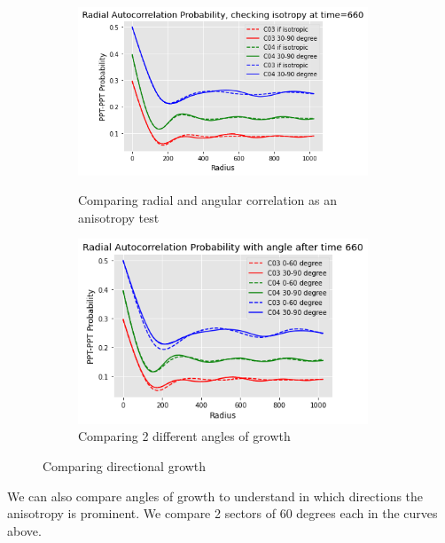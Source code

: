 \documentclass[12pt, a4paper]{report}
\begin{document}
\begin{figure}[H]
\centering
\begin{subfigure}{.49\textwidth}
  \centering
  \includegraphics[width=0.95\textwidth]{Pictures/MSFeatures/ShowingAnisotropyAngle.png}
  \label{img:microstrImg}
  \caption{Comparing radial and angular correlation as an anisotropy test}
\end{subfigure}
\begin{subfigure}{.49\textwidth}
  \centering
  \includegraphics[width=0.95\textwidth]{Pictures/MSFeatures/RadialCorr306090Comparison.png}
  \caption{Comparing 2 different angles of growth}
  \label{img:microstrImg}
\end{subfigure}

\caption{Comparing directional growth}
\label{fig:test}
\end{figure}

We can also compare angles of growth to understand in which directions the anisotropy is prominent. We compare 2 sectors of 60 degrees each in the curves above.
\end{document}
